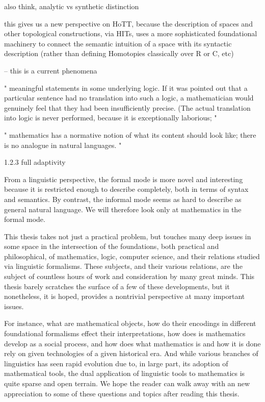 also think, analytic vs synthetic distinction

this gives us a new perspective on HoTT, because the description of spaces and
other topological constructions, via HITs, uses a more sophisticated
foundational machinery to connect the semantic intuition of a space with its
syntactic description (rather than defining Homotopies classically over R or C, etc)


-- this is a current phenomena

"
meaningful statements in some underlying logic. If it was pointed out that
a particular sentence had no translation into such a logic, a mathematician
would genuinely feel that they had been insufficiently precise. (The actual
translation into logic is never performed, because it is exceptionally laborious;
"


"
mathematics has a normative notion of what its content should look like; there is no
analogue in natural languages.
"

1.2.3 full adaptivity


From a linguistic perspective, the formal mode is more novel and interesting
because it is restricted enough to describe completely, both in terms of syntax
and semantics. By contrast, the informal mode seems as hard to describe as
general natural language. We will therefore look only at mathematics in the
formal mode.



This thesis takes not just a practical problem, but touches many deep issues in
some space in the intersection of the foundations, both practical and
philosophical, of mathematics, logic, computer science, and their relations
studied via linguistic formalisms. These subjects, and their various relations,
are the subject of countless hours of work and consideration by many great
minds. This thesis barely scratches the surface of a few of these developments,
but it nonetheless, it is hoped, provides a nontrivial perspective at many
important issues.

For instance, what are mathematical objects, how do their encodings in different
foundational formalisms effect their interpretations, how does is mathematics
develop as a social process, and how does what mathematics is and how it is done
rely on given technologies of a given historical era. And while various branches
of linguistics has
seen rapid evolution due to, in large part, its adoption of mathematical tools,
the dual application of linguistic tools to mathematics is quite sparse and open
terrain.  We hope the reader can walk away with an new appreciation to some of
these questions and topics after reading this thesis.

